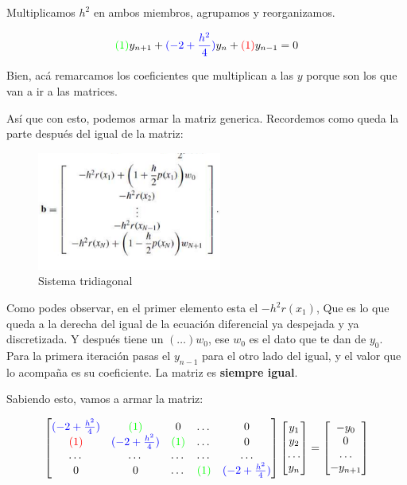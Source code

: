 Multiplicamos $h^2$ en ambos miembros, agrupamos y reorganizamos. 


$$
    \textcolor{green}{(1)}y_{n+1} + \textcolor{blue}{(-2 + \frac{h^2}{4})}y_n + \textcolor{red}{(1)}y_{n-1} = 0  
$$

Bien, acá remarcamos los coeficientes que multiplican a las $y$ porque son los que van a ir a las matrices. 

Así que con esto, podemos armar la matriz generica. Recordemos como queda la parte después del igual de la matriz: 
\newpage
\begin{figure}[h!]
    \centering
    \includegraphics[width=0.5\linewidth]{b_matrix_pvc.png}
    \caption{Sistema tridiagonal}
    \label{fig:enter-label}
\end{figure}

Como podes observar, en el primer elemento esta el $-h^2 r(x_1)$, Que es lo que queda a la derecha del igual de la ecuación diferencial ya despejada y ya discretizada. Y después tiene un $(\dots)w_0$, ese $w_0$ es el dato que te dan de $y_0$. Para la primera iteración pasas el $y_{n-1}$ para el otro lado del igual, y el valor que lo acompaña es su coeficiente. La matriz es \textbf{siempre igual}.

Sabiendo esto, vamos a armar la matriz: 

\[
\begin{bmatrix}
\textcolor{blue}{(-2 + \frac{h^2}{4})} & \textcolor{green}{(1)} & 0 & \dots & 0 \\
\textcolor{red}{(1)} & \textcolor{blue}{(-2 + \frac{h^2}{4})} & \textcolor{green}{(1)} & \dots & 0 \\
\dots  & \dots  & \dots  & \dots & \dots  \\
0 & 0 & \dots & \textcolor{green}{(1)} & \textcolor{blue}{(-2 + \frac{h^2}{4})}
\end{bmatrix}
\begin{bmatrix}
y_1 \\ y_2 \\ \dots \\ y_n 
\end{bmatrix}
=
\begin{bmatrix}
-y_0 \\ 0 \\ \dots \\ -y_{n+1}
\end{bmatrix}
\]

